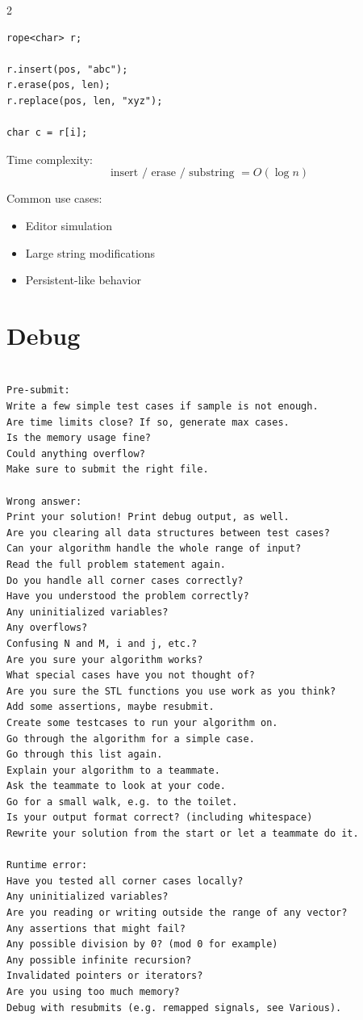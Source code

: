 \documentclass[a4paper,landscape]{article}
\begin{document}
\begin{multicols}{2}
\begin{lstlisting}
rope<char> r;

r.insert(pos, "abc");
r.erase(pos, len);
r.replace(pos, len, "xyz");

char c = r[i];
\end{lstlisting}

Time complexity:
\[
\text{insert / erase / substring } = O(\log n)
\]

Common use cases:
\begin{itemize}
    \item Editor simulation
    \item Large string modifications
    \item Persistent-like behavior
\end{itemize}

\hline
\section{Debug}
\hline
\begin{verbatim}

Pre-submit:
Write a few simple test cases if sample is not enough.
Are time limits close? If so, generate max cases.
Is the memory usage fine?
Could anything overflow?
Make sure to submit the right file.

Wrong answer:
Print your solution! Print debug output, as well.
Are you clearing all data structures between test cases?
Can your algorithm handle the whole range of input?
Read the full problem statement again.
Do you handle all corner cases correctly?
Have you understood the problem correctly?
Any uninitialized variables?
Any overflows?
Confusing N and M, i and j, etc.?
Are you sure your algorithm works?
What special cases have you not thought of?
Are you sure the STL functions you use work as you think?
Add some assertions, maybe resubmit.
Create some testcases to run your algorithm on.
Go through the algorithm for a simple case.
Go through this list again.
Explain your algorithm to a teammate.
Ask the teammate to look at your code.
Go for a small walk, e.g. to the toilet.
Is your output format correct? (including whitespace)
Rewrite your solution from the start or let a teammate do it.

Runtime error:
Have you tested all corner cases locally?
Any uninitialized variables?
Are you reading or writing outside the range of any vector?
Any assertions that might fail?
Any possible division by 0? (mod 0 for example)
Any possible infinite recursion?
Invalidated pointers or iterators?
Are you using too much memory?
Debug with resubmits (e.g. remapped signals, see Various).


\end{verbatim}
\end{multicols}
\end{document}
